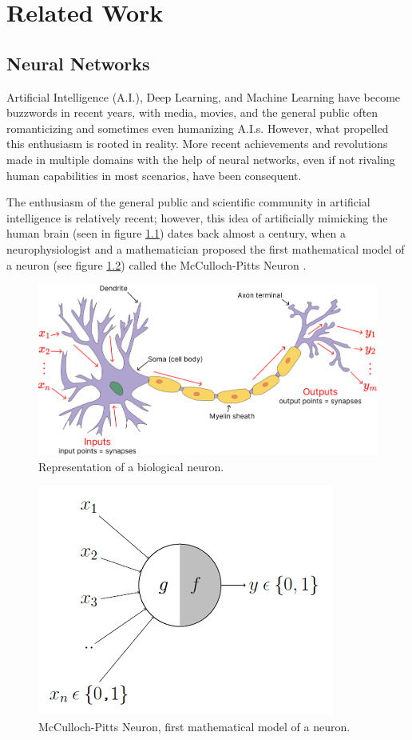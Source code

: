 \chapter{Related Work}
\label{RelatedWork}
\section{Neural Networks}
\label{neural_networks}

\overridetextsize
Artificial Intelligence (A.I.), Deep Learning, and Machine Learning have become
buzzwords in recent years, with media, movies, and the general public often
romanticizing and sometimes even humanizing A.I.s. However, what propelled this
enthusiasm is rooted in reality. More recent achievements and revolutions made
in multiple domains with the help of neural networks, even if not rivaling human
capabilities in most scenarios, have been consequent.

The enthusiasm of the general public and scientific community in artificial
intelligence is relatively recent; however, this idea of artificially mimicking
the human brain (seen in figure \ref{fig:biological_neuron}) dates back almost a
century, when a neurophysiologist and a mathematician proposed the first
mathematical model of a neuron (see figure \ref{fig:mccullock_neuron}) called
the McCulloch-Pitts Neuron \cite{warren_s_mcculloch_walter_pitts_logical_1943}.

\begin{figure}[ht]
    \includegraphics[clip,width=1\columnwidth]{Figures/related/biological_neuron.png}
    \caption{ Representation of a biological neuron. }
    \label{fig:biological_neuron}
\end{figure}

\begin{figure}[htp]
    \centering
    \includegraphics[clip,width=.5\columnwidth]{Figures/related/cullock-neuron.png}
    \caption{ McCulloch-Pitts Neuron, first mathematical model of a neuron. }
    \label{fig:mccullock_neuron}
\end{figure}

